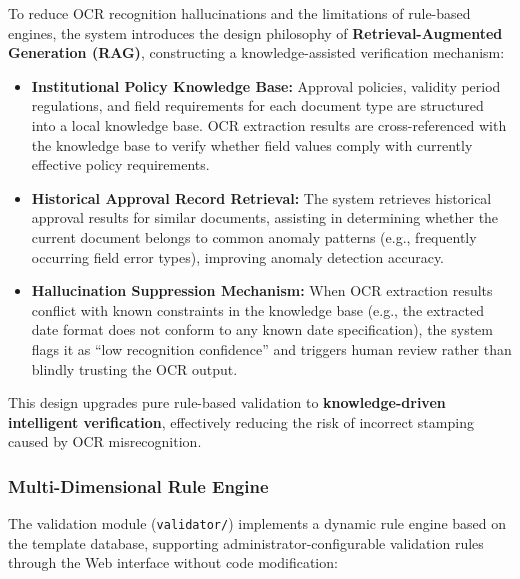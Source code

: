 \documentclass[conference]{IEEEtran}
\begin{document}
To reduce OCR recognition hallucinations and the limitations of rule-based engines, the system introduces the design philosophy of \textbf{Retrieval-Augmented Generation (RAG)}, constructing a knowledge-assisted verification mechanism:

\begin{itemize}[leftmargin=*]
    \item \textbf{Institutional Policy Knowledge Base:} Approval policies, validity period regulations, and field requirements for each document type are structured into a local knowledge base. OCR extraction results are cross-referenced with the knowledge base to verify whether field values comply with currently effective policy requirements.
    \item \textbf{Historical Approval Record Retrieval:} The system retrieves historical approval results for similar documents, assisting in determining whether the current document belongs to common anomaly patterns (e.g., frequently occurring field error types), improving anomaly detection accuracy.
    \item \textbf{Hallucination Suppression Mechanism:} When OCR extraction results conflict with known constraints in the knowledge base (e.g., the extracted date format does not conform to any known date specification), the system flags it as ``low recognition confidence'' and triggers human review rather than blindly trusting the OCR output.
\end{itemize}

\noindent This design upgrades pure rule-based validation to \textbf{knowledge-driven intelligent verification}, effectively reducing the risk of incorrect stamping caused by OCR misrecognition.

\subsubsection{Multi-Dimensional Rule Engine}

The validation module (\texttt{validator/}) implements a dynamic rule engine based on the template database, supporting administrator-configurable validation rules through the Web interface without code modification:
\end{document}
